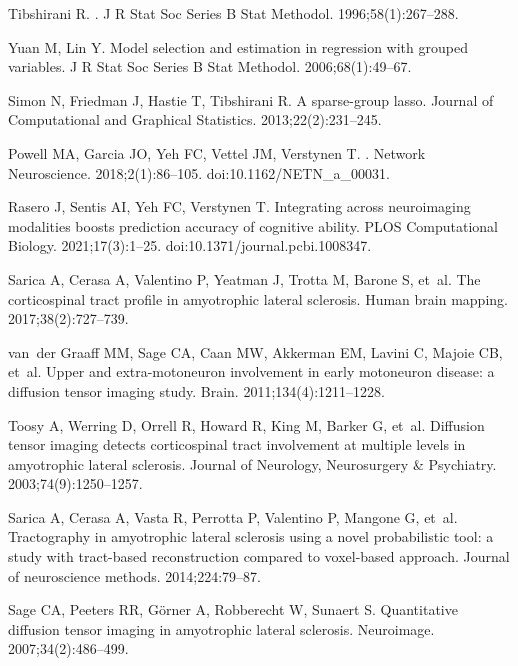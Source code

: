 \documentclass[10pt,letterpaper]{article}
\begin{document}
\begin{thebibliography}{100}
Tibshirani R.
.
\newblock J R Stat Soc Series B Stat Methodol. 1996;58(1):267--288.

Yuan M, Lin Y.
\newblock Model selection and estimation in regression with grouped variables.
\newblock J R Stat Soc Series B Stat Methodol. 2006;68(1):49--67.

Simon N, Friedman J, Hastie T, Tibshirani R.
\newblock A sparse-group lasso.
\newblock Journal of Computational and Graphical Statistics.
  2013;22(2):231--245.

Powell MA, Garcia JO, Yeh FC, Vettel JM, Verstynen T.
.
\newblock Network Neuroscience. 2018;2(1):86--105.
\newblock doi:{10.1162/NETN\_a\_00031}.

Rasero J, Sentis AI, Yeh FC, Verstynen T.
\newblock Integrating across neuroimaging modalities boosts prediction accuracy
  of cognitive ability.
\newblock PLOS Computational Biology. 2021;17(3):1--25.
\newblock doi:{10.1371/journal.pcbi.1008347}.

Sarica A, Cerasa A, Valentino P, Yeatman J, Trotta M, Barone S, et~al.
\newblock The corticospinal tract profile in amyotrophic lateral sclerosis.
\newblock Human brain mapping. 2017;38(2):727--739.

van~der Graaff MM, Sage CA, Caan MW, Akkerman EM, Lavini C, Majoie CB, et~al.
\newblock Upper and extra-motoneuron involvement in early motoneuron disease: a
  diffusion tensor imaging study.
\newblock Brain. 2011;134(4):1211--1228.

Toosy A, Werring D, Orrell R, Howard R, King M, Barker G, et~al.
\newblock Diffusion tensor imaging detects corticospinal tract involvement at
  multiple levels in amyotrophic lateral sclerosis.
\newblock Journal of Neurology, Neurosurgery \& Psychiatry.
  2003;74(9):1250--1257.

Sarica A, Cerasa A, Vasta R, Perrotta P, Valentino P, Mangone G, et~al.
\newblock Tractography in amyotrophic lateral sclerosis using a novel
  probabilistic tool: a study with tract-based reconstruction compared to
  voxel-based approach.
\newblock Journal of neuroscience methods. 2014;224:79--87.

Sage CA, Peeters RR, G{\"o}rner A, Robberecht W, Sunaert S.
\newblock Quantitative diffusion tensor imaging in amyotrophic lateral
  sclerosis.
\newblock Neuroimage. 2007;34(2):486--499.


\end{thebibliography}
\end{document}
